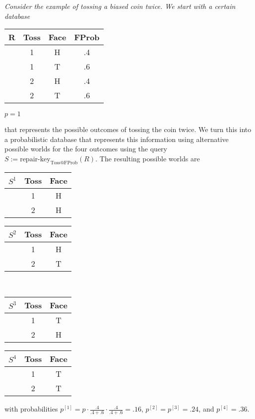 \begin{itemize}
\begin{example}\em
\label{ex:biased2}
Consider the example of tossing a biased coin twice. We start with a certain database
\begin{center}
\begin{tabular}{c|c@{~~}c@{~~}c}
\hline
R & Toss & Face & FProb \\
\hline
 & 1 & H & .4 \\
 & 1 & T & .6 \\
 & 2 & H & .4 \\
 & 2 & T & .6 \\
\end{tabular}
$p = 1$
\end{center}
that represents the possible outcomes of tossing the coin twice.
We turn this into a probabilistic database that represents this information using alternative possible worlds for the four outcomes using the query
$
S := \mbox{repair-key}_{\mathrm{Toss}@\mathrm{FProb}}(R).
$
The resulting possible worlds are
\begin{center}
\begin{tabular}{c|c@{~~}c}
\hline
$S^1$ & Toss & Face \\
\hline
 & 1 & H \\
 & 2 & H \\
\end{tabular}
%
\begin{tabular}{c|c@{~~}c}
\hline
$S^2$ & Toss & Face \\
\hline
 & 1 & H \\
 & 2 & T \\
\end{tabular}
\\[.7ex]
%
\begin{tabular}{c|c@{~~}c}
\hline
$S^3$ & Toss & Face \\
\hline
 & 1 & T \\
 & 2 & H \\
\end{tabular}
%
\begin{tabular}{c|c@{~~}c}
\hline
$S^4$ & Toss & Face \\
\hline
 & 1 & T \\
 & 2 & T \\
\end{tabular}
\end{center}
with probabilities
$p^{[1]} = p \cdot \frac{.4}{.4+.6} \cdot \frac{.4}{.4+.6} =
.16$, $p^{[2]}=p^{[3]}=.24$, and $p^{[4]}=.36$.
\punto
\end{example}
\end{itemize}

